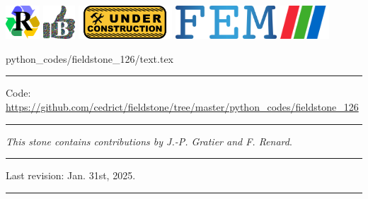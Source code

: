 \noindent
\includegraphics[height=1.25cm]{images/pictograms/replication}
\includegraphics[height=1.25cm]{images/pictograms/benchmark}
\includegraphics[height=1.25cm]{images/pictograms/under_construction}
\includegraphics[height=1.25cm]{images/pictograms/FEM}
\includegraphics[height=1.25cm]{images/pictograms/paraview}


\begin{flushright} {\tiny {\color{gray} python\_codes/fieldstone\_126/text.tex}} \end{flushright}

%

\par\noindent\rule{\textwidth}{0.4pt}

\begin{center}
\inpython
{\small Code: \url{https://github.com/cedrict/fieldstone/tree/master/python_codes/fieldstone_126}}
\end{center}

\par\noindent\rule{\textwidth}{0.4pt}

{\sl This stone contains contributions by J.-P. Gratier and F. Renard}. 

\par\noindent\rule{\textwidth}{0.4pt}

Last revision: Jan. 31st, 2025.

\par\noindent\rule{\textwidth}{0.4pt}

